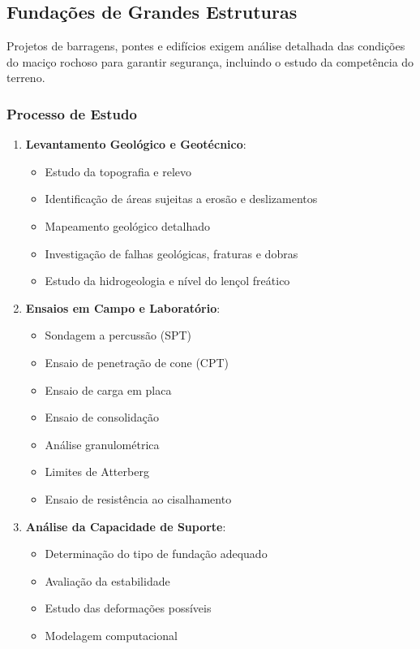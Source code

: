 \documentclass[12pt,a4paper,twoside]{book}
\begin{document}
\subsection{Fundações de Grandes Estruturas}

Projetos de barragens, pontes e edifícios exigem análise detalhada das condições do maciço rochoso 
para garantir segurança, incluindo o estudo da competência do terreno.

\subsubsection{Processo de Estudo}

\begin{enumerate}
    \item \textbf{Levantamento Geológico e Geotécnico}:
    \begin{itemize}
        \item Estudo da topografia e relevo
        \item Identificação de áreas sujeitas a erosão e deslizamentos
        \item Mapeamento geológico detalhado
        \item Investigação de falhas geológicas, fraturas e dobras
        \item Estudo da hidrogeologia e nível do lençol freático
    \end{itemize}
    
    \item \textbf{Ensaios em Campo e Laboratório}:
    \begin{itemize}
        \item Sondagem a percussão (SPT)
        \item Ensaio de penetração de cone (CPT)
        \item Ensaio de carga em placa
        \item Ensaio de consolidação
        \item Análise granulométrica
        \item Limites de Atterberg
        \item Ensaio de resistência ao cisalhamento
    \end{itemize}
    
    \item \textbf{Análise da Capacidade de Suporte}:
    \begin{itemize}
        \item Determinação do tipo de fundação adequado
        \item Avaliação da estabilidade
        \item Estudo das deformações possíveis
        \item Modelagem computacional
    \end{itemize}
    

\end{enumerate}
\end{document}
